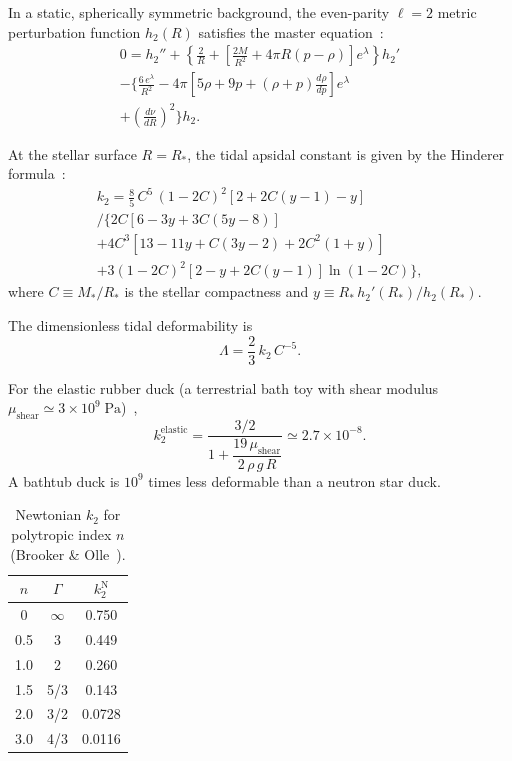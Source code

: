 \documentclass[aps,prd,twocolumn,superscriptaddress,nofootinbib]{revtex4-2}
\begin{document}
In a static, spherically symmetric background, the even-parity $\ell=2$
metric perturbation function $h_2(R)$ satisfies the master
equation~\cite{Hinderer2008, DamourNagar2009, YagiYunes2013b}:
\begin{multline}
0 = h_2'' + \left\{\frac{2}{R} + \left[\frac{2M}{R^2}
  + 4\pi R(p - \rho)\right]e^{\lambda}\right\}h_2' \\
  - \Bigg\{\frac{6\,e^{\lambda}}{R^2}
  - 4\pi\left[5\rho + 9p + (\rho+p)\frac{d\rho}{dp}\right]e^{\lambda} \\
  + \left(\frac{d\nu}{dR}\right)^{\!2}\Bigg\}h_2.
\label{eq:h2_master}
\end{multline}

At the stellar surface $R = R_*$, the tidal apsidal constant is given by
the Hinderer formula~\cite{Hinderer2008}:
\begin{multline}
k_2 = \frac{8}{5}\,C^5\,(1 - 2C)^2[2 + 2C(y-1) - y] \\
\Big/ \Big\{
  2C[6 - 3y + 3C(5y - 8)] \\
  + 4C^3[13 - 11y + C(3y - 2) + 2C^2(1+y)] \\
  + 3(1 - 2C)^2[2 - y + 2C(y-1)]\ln(1 - 2C)
\Big\},
\label{eq:hinderer}
\end{multline}
where $C \equiv M_*/R_*$ is the stellar compactness and $y \equiv
R_*\,h_2'(R_*)/h_2(R_*)$.

The dimensionless tidal deformability is
\begin{equation}
\Lambda = \frac{2}{3}\,k_2\,C^{-5}.
\label{eq:Lambda_def}
\end{equation}

For the elastic rubber duck (a terrestrial bath toy with shear modulus
$\mu_{\mathrm{shear}} \simeq 3\times 10^9\;\mathrm{Pa}$)~\cite{Love1909},
\begin{equation}
k_2^{\mathrm{elastic}} = \frac{3/2}{1 + \dfrac{19\,\mu_{\mathrm{shear}}}
{2\,\rho\,g\,R}} \simeq 2.7\times 10^{-8}.
\label{eq:k2_rubber}
\end{equation}
A bathtub duck is $10^9$ times less deformable than a neutron star duck.

\begin{table}[!htb]
\caption{Newtonian $k_2$ for polytropic index $n$ (Brooker \&
Olle~\cite{BrookerOlle1955}).}
\label{tab:k2_newtonian}
\begin{ruledtabular}
\begin{tabular}{ccc}
$n$ & $\Gamma$ & $k_2^{\mathrm{N}}$ \\
\hline
0   & $\infty$ & 0.750 \\
0.5 & 3        & 0.449 \\
1.0 & 2        & 0.260 \\
1.5 & 5/3      & 0.143 \\
2.0 & 3/2      & 0.0728 \\
3.0 & 4/3      & 0.0116 \\
\end{tabular}
\end{ruledtabular}
\end{table}
\end{document}
